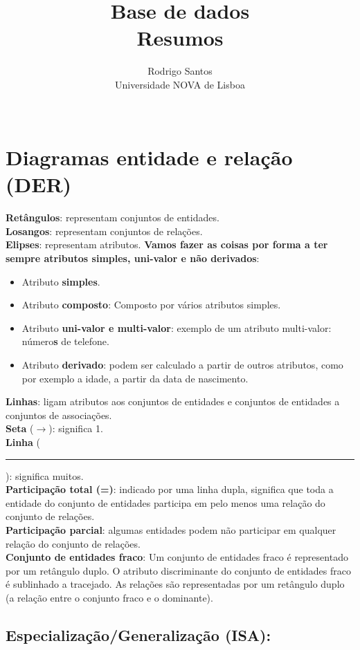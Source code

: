 \documentclass{article}
\title{Base de dados \large \\ Resumos}
\author{Rodrigo Santos\\
  \small Universidade NOVA de Lisboa\\\\
}
\date{\vspace{-5ex}}
\newcommand*{\xdash}[1][3em]{\rule[0.5ex]{#1}{0.55pt}}
\begin{document}
\maketitle

\section{Diagramas entidade e relação (DER)}
\textbf{Retângulos}: representam conjuntos de entidades. \\
\textbf{Losangos}: representam conjuntos de relações. \\
\textbf{Elipses}: representam atributos. \textbf{Vamos fazer as coisas por forma a ter sempre atributos simples, uni-valor e não derivados}:
\begin{itemize}
  \item Atributo \textbf{simples}.
  \item Atributo \textbf{composto}: Composto por vários atributos simples.
  \item Atributo \textbf{uni-valor e multi-valor}: exemplo de um atributo multi-valor: número\textbf{s} de telefone.
  \item Atributo \textbf{derivado}:  podem ser calculado a partir de outros atributos, como por exemplo a idade, a partir da data de nascimento.
\end{itemize}
\textbf{Linhas}: ligam atributos aos conjuntos de entidades e conjuntos de entidades a conjuntos de associações. \\
\textbf{Seta} ($\rightarrow$): significa 1. \\
\textbf{Linha} (\xdash[1em]): significa muitos. \\
\textbf{Participação total (=)}: indicado por uma linha dupla, significa que toda a entidade do conjunto de entidades participa em pelo menos uma relação do conjunto de relações. \\
\textbf{Participação parcial}: algumas entidades podem não participar em qualquer relação do conjunto de relações. \\
\textbf{Conjunto de entidades fraco}: Um conjunto de entidades fraco é representado por um retângulo duplo. O atributo discriminante do conjunto de entidades fraco é sublinhado a tracejado. As relações são representadas por um retângulo duplo (a relação entre o conjunto fraco e o dominante).

\subsection*{Especialização/Generalização (ISA):}
\end{document}
